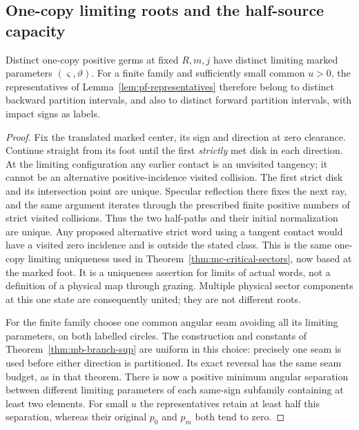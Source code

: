 \subsection{One-copy limiting roots and the half-source capacity}

\begin{lemma}
\label{lem:pf-distinct}
Distinct one-copy positive germs at fixed $R,m,j$ have distinct
limiting marked parameters $(\varsigma,\vartheta)$.
For a finite family and sufficiently small common $u>0$, the
representatives of Lemma~\ref{lem:pf-representatives} therefore
belong to distinct backward partition intervals, and also to
distinct forward partition intervals, with impact signs as labels.
\end{lemma}
\begin{proof}
Fix the translated marked center, its sign and direction at
zero clearance.  Continue straight from its foot until the first
\emph{strictly} met disk in each direction.  At the limiting
configuration any earlier contact is an unvisited tangency; it
cannot be an alternative positive-incidence visited collision.
The first strict disk and its intersection point are unique.
Specular reflection there fixes the next ray, and the same
argument iterates through the prescribed finite positive numbers
of strict visited collisions.  Thus the two half-paths and their
initial normalization are unique.  Any proposed alternative
strict word using a tangent contact would have a visited zero
incidence and is outside the stated class.  This is the same
one-copy limiting uniqueness used in
Theorem~\ref{thm:mc-critical-sectors}, now based at the marked foot.
It is a uniqueness assertion for limits of actual words, not a
definition of a physical map through grazing.  Multiple physical
sector components at this one state are consequently united;
they are not different roots.

For the finite family choose one common angular seam avoiding
all its limiting parameters, on both labelled circles.  The
construction and constants of Theorem~\ref{thm:mb-branch-sup}
are uniform in this choice: precisely one seam is used before
either direction is partitioned.  Its exact reversal has the
same seam budget, as in that theorem.  There is now a positive
minimum angular separation between different limiting parameters
of each same-sign subfamily containing at least two elements.
For small $u$ the representatives retain at least half this
separation, whereas their original $p_0$ and $p_m$ both tend to zero.


\end{proof}

